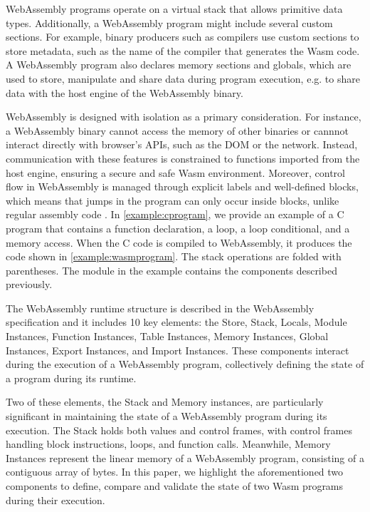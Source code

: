 \documentclass[sigplan,screen]{acmart}
\newcommand*\badge[1]{ \colorbox{red}{\color{white}#1}}
\newcommand{\todo}[1]{%
\refstepcounter{todo}
\noindent\textbf{\badge{TODO}} {\color{red}#1}
\addcontentsline{td}{todo}
{\color{red}\thesection.\thetodo\xspace #1}}
\begin{document}


WebAssembly programs operate on a virtual stack that allows primitive data types.
Additionally, a WebAssembly program might include several custom sections.
For example, binary producers such as compilers use custom sections to store metadata, such as the name of the compiler that generates the Wasm code.
A WebAssembly program also declares memory sections and globals, which are used to store, manipulate and share data during program execution, e.g. to share data with the host engine of the WebAssembly binary.

WebAssembly is designed with isolation as a primary consideration. For instance, a WebAssembly binary cannot access the memory of other binaries or cannnot interact directly with browser's APIs, such as the DOM or the network. Instead, communication with these features is constrained to functions imported from the host engine, ensuring a secure and safe Wasm environment.
Moreover, control flow in WebAssembly is managed through explicit labels and well-defined blocks, which means that jumps in the program can only occur inside blocks, unlike regular assembly code \cite{10.1145/3062341.3062363}. 
In \autoref{example:cprogram}, we provide an example of a C program that contains a function declaration, a loop, a loop conditional, and a memory access. When the C code is compiled to WebAssembly, it produces the code shown in \autoref{example:wasmprogram}. The stack operations are folded with parentheses.
The module in the example contains the components described previously.


The WebAssembly runtime structure is described in the WebAssembly specification and it includes 10 key elements: the Store, Stack, Locals, Module Instances, Function Instances, Table Instances, Memory Instances, Global Instances, Export Instances, and Import Instances. These components interact during the execution of a WebAssembly program, collectively defining the state of a program during its runtime.

Two of these elements, the Stack and Memory instances, are particularly significant in maintaining the state of a WebAssembly program during its execution. The Stack holds both values and control frames, with control frames handling block instructions, loops, and function calls. Meanwhile, Memory Instances represent the linear memory of a WebAssembly program, consisting of a contiguous array of bytes.
In this paper, we highlight the aforementioned two components to define, compare and validate the state of two Wasm programs during their execution. 
\end{document}
